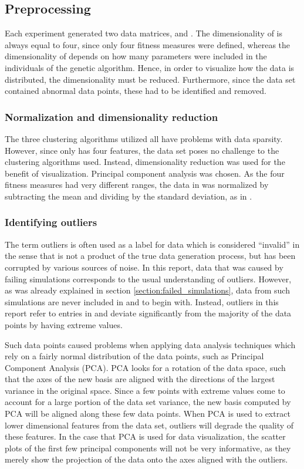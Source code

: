 \subsection{Preprocessing}
Each experiment generated two data matrices, \datamatrixfit{}{} and \datamatrixpar{}. The dimensionality of \datamatrixfit{} is always equal to four, since only four fitness measures were defined, whereas the dimensionality of \datamatrixpar{}{} depends on how many parameters were included in the individuals of the genetic algorithm. Hence, in order to visualize how the data is distributed, the dimensionality must be reduced. Furthermore, since the data set contained abnormal data points, these had to be identified and removed.


\subsubsection{Normalization and dimensionality reduction}
The three clustering algorithms utilized all have problems with data sparsity. However, since \datamatrixfit{} only has four features, the data set poses no challenge to the clustering algorithms used. Instead, dimensionality reduction was used for the benefit of visualization. Principal component analysis was chosen. As the four fitness measures had very different ranges, the data in \datamatrixfit{} was normalized by subtracting the mean and dividing by the standard deviation, as in \cite{salkind2010encyclopedia}.

\subsubsection{Identifying outliers}\label{section:outliers}
The term outliers is often used as a label for data which is considered ``invalid'' in the sense that is not a product of the true data generation process, but has been corrupted by various sources of noise. In this report, data that was caused by failing simulations corresponds to the usual understanding of outliers. However, as was already explained in section \ref{section:failed_simulations}, data from such simulations are never included in \datamatrixpar{} and \datamatrixfit{} to begin with. Instead, outliers in this report refer to entries in \datamatrixpar{} and \datamatrixfit{}  deviate significantly from the majority of the data points by having extreme values.

Such data points caused problems when applying data analysis techniques which rely on a fairly normal distribution of the data points, such as Principal Component Analysis (PCA). PCA looks for a rotation of the data space, such that the axes of the new basis are aligned with the directions of the largest variance in the original space. Since a few points with extreme values come to account for a large portion of the data set variance, the new basis computed by PCA will be aligned along these few data points. When PCA is used to extract lower dimensional features from the data set, outliers will degrade the quality of these features. In the case that PCA is used for data visualization, the scatter plots of the first few principal components will not be very informative, as they merely show the projection of the data onto the axes aligned with the outliers.

